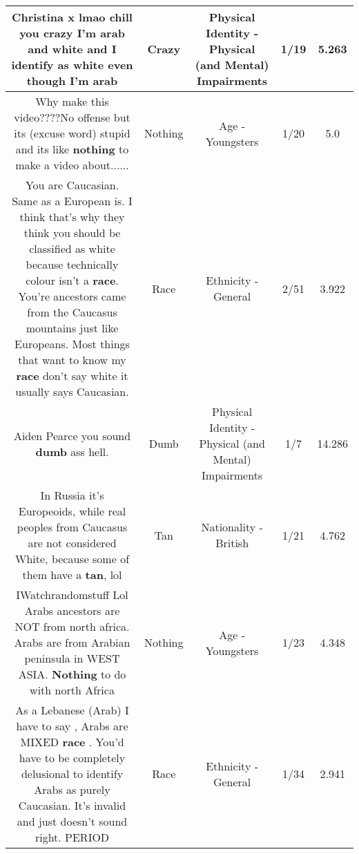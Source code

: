 \documentclass[11pt]{article}
\newlength\mylength
\begin{document}
\begin{center}
\begin{longtable}{|C{.65\mylength}|C{.30\mylength}|C{.12\mylength}|C{.12\mylength}|C{.12\mylength}|}
  \small Christina x lmao chill you \textbf{crazy} I'm arab and white and I identify as white even though I'm arab\normalsize   & Crazy & Physical Identity - Physical (and Mental) Impairments & 1/19 & 5.263 \\  \hline
  \small Why make this video????No offense but its (excuse word) stupid and its like \textbf{nothing} to make a video about......\normalsize   & Nothing & Age - Youngsters & 1/20 & 5.0 \\  \hline
  \small You are Caucasian. Same as a European is. I think that's why they think you should be classified as white because technically colour isn't a \textbf{race}. You're ancestors came from the Caucasus mountains just like Europeans. Most things that want to know my \textbf{race} don't say white it usually says Caucasian.\normalsize   & Race & Ethnicity - General & 2/51 & 3.922 \\  \hline
  \small Aiden Pearce you sound \textbf{dumb} ass   hell.\normalsize   & Dumb & Physical Identity - Physical (and Mental) Impairments & 1/7 & 14.286 \\  \hline
  \small In Russia it's Europeoids, while real peoples from Caucasus are not considered White, because some of them have a \textbf{tan}, lol\normalsize   & Tan & Nationality - British & 1/21 & 4.762 \\  \hline
  \small IWatchrandomstuff Lol Arabs ancestors are NOT from north africa. Arabs are from Arabian peninsula in WEST ASIA. \textbf{Nothing} to do with north Africa\normalsize   & Nothing & Age - Youngsters & 1/23 & 4.348 \\  \hline
  \small As a Lebanese (Arab) I have to say , Arabs are MIXED \textbf{race} . You'd have to be completely delusional to identify Arabs as purely Caucasian. It's invalid and just doesn't sound right. PERIOD\normalsize   & Race & Ethnicity - General & 1/34 & 2.941 \\  \hline

\end{longtable}
\end{center}
\end{document}
